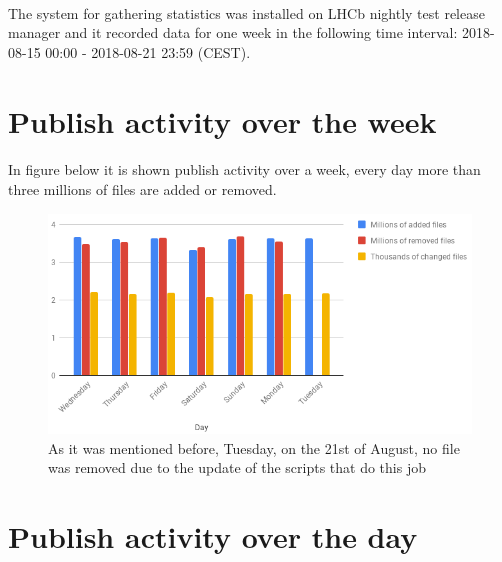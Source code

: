 \paragraph{}
The system for gathering statistics was installed on LHCb nightly test release manager and it recorded data for one week in the following time interval: 2018-08-15  00:00 - 2018-08-21  23:59 (CEST).

\section{Publish activity over the week}

\paragraph{}In figure below it is shown publish activity over a week, every day more than three millions of files are added or removed.

\begin{figure}[h]
\centering
\includegraphics[scale=1.2]{figures/Publish_activity_over_the_week}
\caption{As it was mentioned before, Tuesday, on the 21st of August, no file was removed due to the update of the scripts that do this job}
\end{figure}

\newpage


\section{Publish activity over the day}
\paragraph{}


